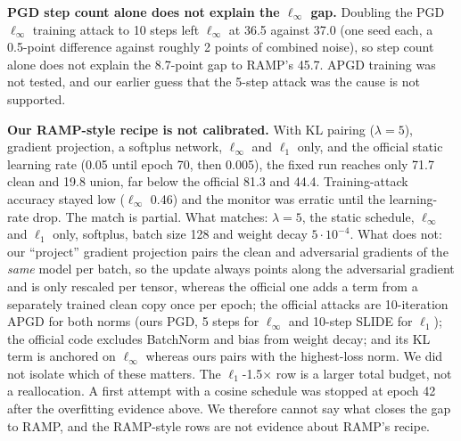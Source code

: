 \documentclass[11pt]{article}
\begin{document}
\textbf{PGD step count alone does not explain the $\ell_\infty$ gap.} Doubling the PGD $\ell_\infty$ training attack to 10 steps left $\ell_\infty$ at 36.5 against 37.0 (one seed each, a 0.5-point difference against roughly 2 points of combined noise), so step count alone does not explain the 8.7-point gap to RAMP's 45.7. APGD training was not tested, and our earlier guess that the 5-step attack was the cause is not supported.

\textbf{Our RAMP-style recipe is not calibrated.} With KL pairing ($\lambda=5$), gradient projection, a softplus network, $\ell_\infty$ and $\ell_1$ only, and the official static learning rate (0.05 until epoch 70, then 0.005), the fixed run reaches only 71.7 clean and 19.8 union, far below the official 81.3 and 44.4.
Training-attack accuracy stayed low ($\ell_\infty$ 0.46) and the monitor was erratic until the learning-rate drop. The match is partial. What matches: $\lambda=5$, the static schedule, $\ell_\infty$ and $\ell_1$ only, softplus, batch size 128 and weight decay $5\cdot10^{-4}$. What does not: our ``project'' gradient projection pairs the clean and adversarial gradients of the \emph{same} model per batch, so the update always points along the adversarial gradient and is only rescaled per tensor, whereas the official one adds a term from a separately trained clean copy once per epoch; the official attacks are 10-iteration APGD for both norms (ours PGD, 5 steps for $\ell_\infty$ and 10-step SLIDE for $\ell_1$); the official code excludes BatchNorm and bias from weight decay; and its KL term is anchored on $\ell_\infty$ whereas ours pairs with the highest-loss norm. We did not isolate which of these matters.
The $\ell_1$-1.5$\times$ row is a larger total budget, not a reallocation. A first attempt with a cosine schedule was stopped at epoch 42 after the overfitting evidence above. We therefore cannot say what closes the gap to RAMP, and the RAMP-style rows are not evidence about RAMP's recipe.
\end{document}
